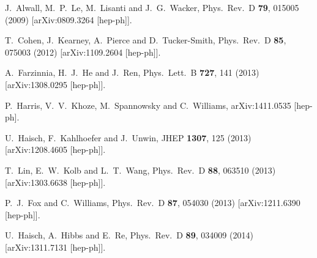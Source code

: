 \begin{thebibliography}{90}

  J.~Alwall, M.~P.~Le, M.~Lisanti and J.~G.~Wacker,
  Phys.\ Rev.\  D {\bf 79}, 015005 (2009)
  [arXiv:0809.3264 [hep-ph]].

  T.~Cohen, J.~Kearney, A.~Pierce and D.~Tucker-Smith,
  Phys.\ Rev.\ D {\bf 85}, 075003 (2012)
  [arXiv:1109.2604 [hep-ph]].

  A.~Farzinnia, H.~J.~He and J.~Ren,
  Phys.\ Lett.\ B {\bf 727}, 141 (2013)
  [arXiv:1308.0295 [hep-ph]].


  P.~Harris, V.~V.~Khoze, M.~Spannowsky and C.~Williams,
  arXiv:1411.0535 [hep-ph].
  
  
  
  U.~Haisch, F.~Kahlhoefer and J.~Unwin,
  JHEP {\bf 1307}, 125 (2013)
  [arXiv:1208.4605 [hep-ph]].
  
  T.~Lin, E.~W.~Kolb and L.~T.~Wang,
  Phys.\ Rev.\ D {\bf 88},  063510 (2013)
  [arXiv:1303.6638 [hep-ph]].
  
  P.~J.~Fox and C.~Williams,
  Phys.\ Rev.\ D {\bf 87},  054030 (2013)
  [arXiv:1211.6390 [hep-ph]].
  
  U.~Haisch, A.~Hibbs and E.~Re,
  Phys.\ Rev.\ D {\bf 89}, 034009 (2014)
  [arXiv:1311.7131 [hep-ph]].
  

\end{thebibliography}
